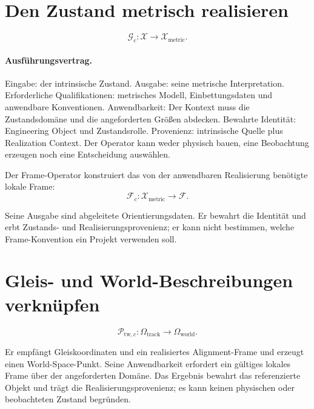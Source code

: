\section{Den Zustand metrisch realisieren}

\begin{definition}
\label{def:metric-realization-operator}
\[
\mathcal G_c:\mathcal X\rightarrow\mathcal X_{\mathrm{metric}}.
\]
\end{definition}

\paragraph{Ausführungsvertrag.}
Eingabe: der intrinsische Zustand. Ausgabe: seine metrische Interpretation.
Erforderliche Qualifikationen: metrisches Modell, Einbettungsdaten und
anwendbare Konventionen. Anwendbarkeit: Der Kontext muss die Zustandsdomäne
und die angeforderten Größen abdecken. Bewahrte Identität: Engineering Object
und Zustandsrolle. Provenienz: intrinsische Quelle plus Realization Context.
Der Operator kann weder physisch bauen, eine Beobachtung erzeugen noch eine
Entscheidung auswählen.

\begin{definition}
\label{def:frame-operator}
Der Frame-Operator konstruiert das von der anwendbaren Realisierung benötigte
lokale Frame:
\[
\mathcal F_c:\mathcal X_{\mathrm{metric}}\rightarrow\mathcal F.
\]
\end{definition}

Seine Ausgabe sind abgeleitete Orientierungsdaten. Er bewahrt die Identität
und erbt Zustands- und Realisierungsprovenienz; er kann nicht bestimmen,
welche Frame-Konvention ein Projekt verwenden soll.

\section{Gleis- und World-Beschreibungen verknüpfen}

\begin{definition}
\label{def:track-to-world-operator}
\[
\mathcal P_{\mathrm{tw},c}:
\Omega_{\mathrm{track}}\rightarrow\Omega_{\mathrm{world}}.
\]
\end{definition}

Er empfängt Gleiskoordinaten und ein realisiertes Alignment-Frame und erzeugt
einen World-Space-Punkt. Seine Anwendbarkeit erfordert ein gültiges lokales
Frame über der angeforderten Domäne. Das Ergebnis bewahrt das referenzierte
Objekt und trägt die Realisierungsprovenienz; es kann keinen physischen oder
beobachteten Zustand begründen.


